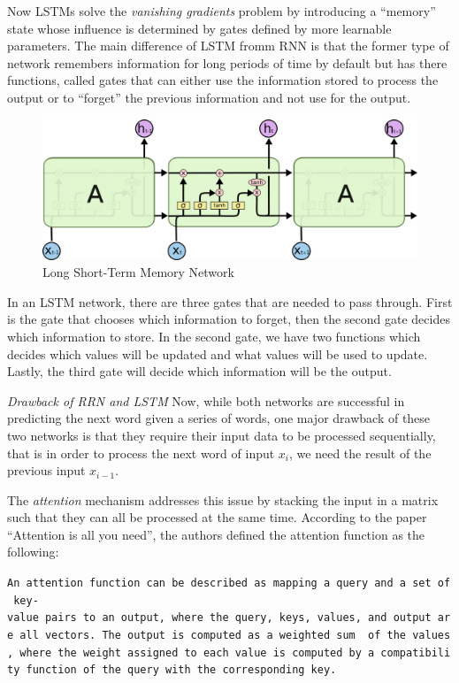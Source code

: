 \documentclass[
  letterpaper,
  DIV=11,
  numbers=noendperiod]{scrartcl}
\begin{document}
Now LSTMs solve the \emph{vanishing gradients} problem by introducing a
``memory'' state whose influence is determined by gates defined by more
learnable parameters. The main difference of LSTM fromm RNN is that the
former type of network remembers information for long periods of time by
default but has there functions, called gates that can either use the
information stored to process the output or to ``forget'' the previous
information and not use for the output.

\begin{figure}

{\centering \includegraphics{Figures_LLM/lstm.png}

}

\caption{\label{fig-lstm}Long Short-Term Memory Network}

\end{figure}

In an LSTM network, there are three gates that are needed to pass
through. First is the gate that chooses which information to forget,
then the second gate decides which information to store. In the second
gate, we have two functions which decides which values will be updated
and what values will be used to update. Lastly, the third gate will
decide which information will be the output.

\emph{Drawback of RRN and LSTM} Now, while both networks are successful
in predicting the next word given a series of words, one major drawback
of these two networks is that they require their input data to be
processed sequentially, that is in order to process the next word of
input \(x_i\), we need the result of the previous input \(x_{i-1}\).

The \emph{attention} mechanism addresses this issue by stacking the
input in a matrix such that they can all be processed at the same time.
According to the paper ``Attention is all you need'', the authors
defined the attention function as the following:

\texttt{An\ attention\ function\ can\ be\ described\ as\ mapping\ a\ query\ and\ a\ set\ of\ key-value\ pairs\ to\ an\ output,\ where\ the\ query,\ keys,\ values,\ and\ output\ are\ all\ vectors.\ The\ output\ is\ computed\ as\ a\ weighted\ sum\ \ of\ the\ values,\ where\ the\ weight\ assigned\ to\ each\ value\ is\ computed\ by\ a\ compatibility\ function\ of\ the\ query\ with\ the\ corresponding\ key.}
\end{document}
